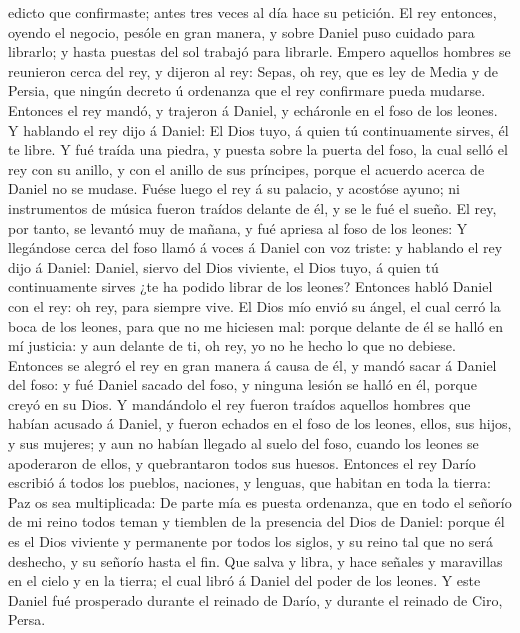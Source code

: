 edicto que confirmaste; antes tres veces al día hace su petición.
 El rey entonces, oyendo el negocio, pesóle en gran
manera, y sobre Daniel puso cuidado para librarlo; y hasta puestas del
sol trabajó para librarle.  Empero aquellos hombres se
reunieron cerca del rey, y dijeron al rey: Sepas, oh rey, que es ley de
Media y de Persia, que ningún decreto ú ordenanza que el rey confirmare
pueda mudarse.  Entonces el rey mandó, y trajeron á
Daniel, y echáronle en el foso de los leones. Y hablando el rey dijo á
Daniel: El Dios tuyo, á quien tú continuamente sirves, él te libre.
 Y fué traída una piedra, y puesta sobre la puerta del
foso, la cual selló el rey con su anillo, y con el anillo de sus
príncipes, porque el acuerdo acerca de Daniel no se mudase.
 Fuése luego el rey á su palacio, y acostóse ayuno; ni
instrumentos de música fueron traídos delante de él, y se le fué el
sueño.  El rey, por tanto, se levantó muy de mañana, y
fué apriesa al foso de los leones:  Y llegándose cerca
del foso llamó á voces á Daniel con voz triste: y hablando el rey dijo á
Daniel: Daniel, siervo del Dios viviente, el Dios tuyo, á quien tú
continuamente sirves ¿te ha podido librar de los leones? 
Entonces habló Daniel con el rey: oh rey, para siempre vive.
 El Dios mío envió su ángel, el cual cerró la boca de los
leones, para que no me hiciesen mal: porque delante de él se halló en mí
justicia: y aun delante de ti, oh rey, yo no he hecho lo que no debiese.
 Entonces se alegró el rey en gran manera á causa de él,
y mandó sacar á Daniel del foso: y fué Daniel sacado del foso, y ninguna
lesión se halló en él, porque creyó en su Dios.  Y
mandándolo el rey fueron traídos aquellos hombres que habían acusado á
Daniel, y fueron echados en el foso de los leones, ellos, sus hijos, y
sus mujeres; y aun no habían llegado al suelo del foso, cuando los
leones se apoderaron de ellos, y quebrantaron todos sus huesos.
 Entonces el rey Darío escribió á todos los pueblos,
naciones, y lenguas, que habitan en toda la tierra: Paz os sea
multiplicada:  De parte mía es puesta ordenanza, que en
todo el señorío de mi reino todos teman y tiemblen de la presencia del
Dios de Daniel: porque él es el Dios viviente y permanente por todos los
siglos, y su reino tal que no será deshecho, y su señorío hasta el fin.
 Que salva y libra, y hace señales y maravillas en el
cielo y en la tierra; el cual libró á Daniel del poder de los leones.
 Y este Daniel fué prosperado durante el reinado de
Darío, y durante el reinado de Ciro, Persa.

